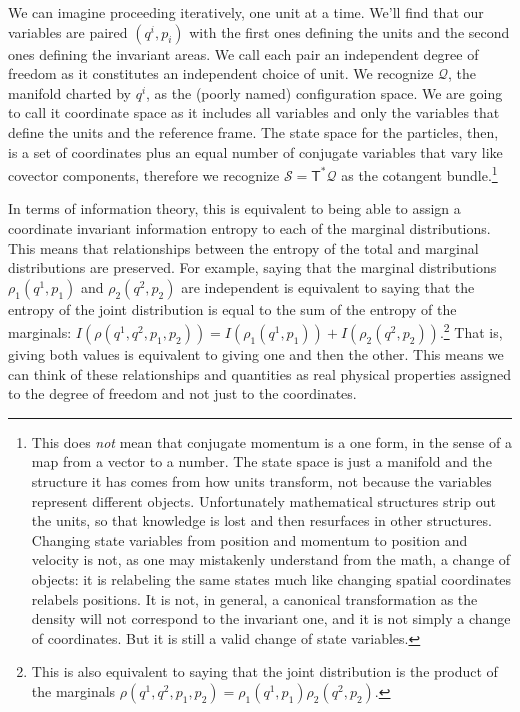 \documentclass[11pt]{article}
\begin{document}
We can imagine proceeding iteratively, one unit at a time. We'll find that our variables are paired $(q^i, p_i)$  with the first ones defining the units and the second ones defining the invariant areas. We call each pair an independent degree of freedom as it constitutes an independent choice of unit. We recognize $\mathcal{Q}$, the manifold charted by $q^i$, as the (poorly named) configuration space. We are going to call it coordinate space as it includes all variables and only the variables that define the units and the reference frame. The state space for the particles, then, is a set of coordinates plus an equal number of conjugate variables that vary like covector components, therefore we recognize $\mathcal{S}=\mathsf{T}^*\mathcal{Q}$ as the cotangent bundle.\footnote{This does \emph{not} mean that conjugate momentum is a one form, in the sense of a map from a vector to a number. The state space is just a manifold and the structure it has comes from how units transform, not because the variables represent different objects. Unfortunately mathematical structures strip out the units, so that knowledge is lost and then resurfaces in other structures. Changing state variables from position and momentum to position and velocity is not, as one may mistakenly understand from the math, a change of objects: it is relabeling the same states much like changing spatial coordinates relabels positions. It is not, in general, a canonical transformation as the density will not correspond to the invariant one, and it is not simply a change of coordinates. But it is still a valid change of state variables.}

In terms of information theory, this is equivalent to being able to assign a coordinate invariant information entropy to each of the marginal distributions. This means that relationships between the entropy of the total and marginal distributions are preserved. For example, saying that the marginal distributions $\rho_1(q^1, p_1)$ and $\rho_2(q^2, p_2)$ are independent is equivalent to saying that the entropy of the joint distribution is equal to the sum of the entropy of the marginals: $I(\rho(q^1,q^2, p_1, p_2)) = I(\rho_1(q^1, p_1)) +I(\rho_2(q^2, p_2))$.\footnote{This is also equivalent to saying that the joint distribution is the product of the marginals $\rho(q^1,q^2, p_1, p_2) = \rho_1(q^1, p_1)\rho_2(q^2, p_2)$.} That is, giving both values is equivalent to giving one and then the other. This means we can think of these relationships and quantities as real physical properties assigned to the degree of freedom and not just to the coordinates.
\end{document}
